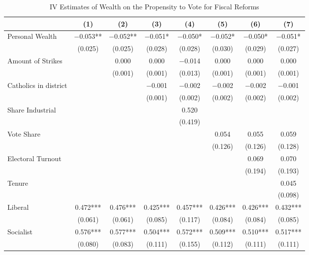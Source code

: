 \begin{table}

\caption{\label{tab:iv_results_inheritance}IV Estimates of Wealth on the Propensity to Vote for Fiscal Reforms}
\centering
\begin{tabular}[t]{lccccccc}
\toprule
  & (1) & (2) & (3) & (4) & (5) & (6) & (7)\\
\midrule
Personal Wealth & \num{-0.053}** & \num{-0.052}** & \num{-0.051}* & \num{-0.050}* & \num{-0.052}* & \num{-0.050}* & \num{-0.051}*\\
 & (\num{0.025}) & (\num{0.025}) & (\num{0.028}) & (\num{0.028}) & (\num{0.030}) & (\num{0.029}) & (\num{0.027})\\
Amount of Strikes &  & \num{0.000} & \num{0.000} & \num{-0.014} & \num{0.000} & \num{0.000} & \num{0.000}\\
 &  & (\num{0.001}) & (\num{0.001}) & (\num{0.013}) & (\num{0.001}) & (\num{0.001}) & (\num{0.001})\\
Catholics in district &  &  & \num{-0.001} & \num{-0.002} & \num{-0.002} & \num{-0.002} & \num{-0.001}\\
 &  &  & (\num{0.001}) & (\num{0.002}) & (\num{0.002}) & (\num{0.002}) & (\num{0.002})\\
Share Industrial &  &  &  & \num{0.520} &  &  & \\
 &  &  &  & (\num{0.419}) &  &  & \\
Vote Share &  &  &  &  & \num{0.054} & \num{0.055} & \num{0.059}\\
 &  &  &  &  & (\num{0.126}) & (\num{0.126}) & (\num{0.128})\\
Electoral Turnout &  &  &  &  &  & \num{0.069} & \num{0.070}\\
 &  &  &  &  &  & (\num{0.194}) & (\num{0.193})\\
Tenure &  &  &  &  &  &  & \num{0.045}\\
 &  &  &  &  &  &  & (\num{0.098})\\
Liberal & \num{0.472}*** & \num{0.476}*** & \num{0.425}*** & \num{0.457}*** & \num{0.426}*** & \num{0.426}*** & \num{0.432}***\\
 & (\num{0.061}) & (\num{0.061}) & (\num{0.085}) & (\num{0.117}) & (\num{0.084}) & (\num{0.084}) & (\num{0.085})\\
Socialist & \num{0.576}*** & \num{0.577}*** & \num{0.504}*** & \num{0.572}*** & \num{0.509}*** & \num{0.510}*** & \num{0.517}***\\
 & (\num{0.080}) & (\num{0.083}) & (\num{0.111}) & (\num{0.155}) & (\num{0.112}) & (\num{0.111}) & (\num{0.111})\\

\end{tabular}
\end{table}
